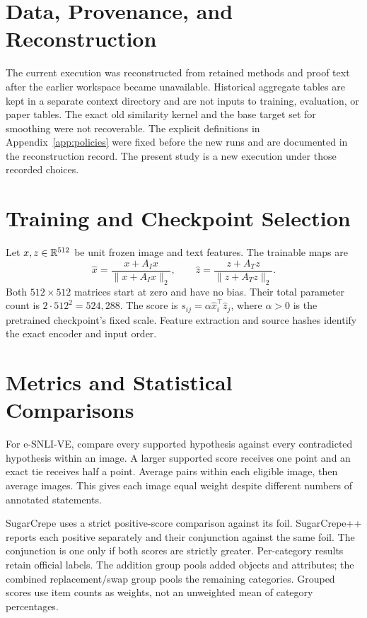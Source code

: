 \section{Data, Provenance, and Reconstruction}
\label{app:provenance}
The current execution was reconstructed from retained methods and proof text after the earlier workspace became unavailable. Historical aggregate tables are kept in a separate context directory and are not inputs to training, evaluation, or paper tables. The exact old similarity kernel and the base target set for smoothing were not recoverable. The explicit definitions in Appendix~\ref{app:policies} were fixed before the new runs and are documented in the reconstruction record. The present study is a new execution under those recorded choices.



\section{Training and Checkpoint Selection}
\label{app:training}
Let $x,z\in\mathbb{R}^{512}$ be unit frozen image and text features. The trainable maps are
\begin{equation}
\widehat x=\frac{x+A_Ix}{\|x+A_Ix\|_2},\qquad
\widehat z=\frac{z+A_Tz}{\|z+A_Tz\|_2}.
\end{equation}
Both $512\times512$ matrices start at zero and have no bias. Their total parameter count is $2\cdot512^2=524{,}288$. The score is $s_{ij}=\alpha\widehat x_i^\top\widehat z_j$, where $\alpha>0$ is the pretrained checkpoint's fixed scale. Feature extraction and source hashes identify the exact encoder and input order.



\section{Metrics and Statistical Comparisons}
\label{app:metrics}
For e-SNLI-VE, compare every supported hypothesis against every contradicted hypothesis within an image. A larger supported score receives one point and an exact tie receives half a point. Average pairs within each eligible image, then average images. This gives each image equal weight despite different numbers of annotated statements.

SugarCrepe uses a strict positive-score comparison against its foil. SugarCrepe++ reports each positive separately and their conjunction against the same foil. The conjunction is one only if both scores are strictly greater. Per-category results retain official labels. The addition group pools added objects and attributes; the combined replacement/swap group pools the remaining categories. Grouped scores use item counts as weights, not an unweighted mean of category percentages.

